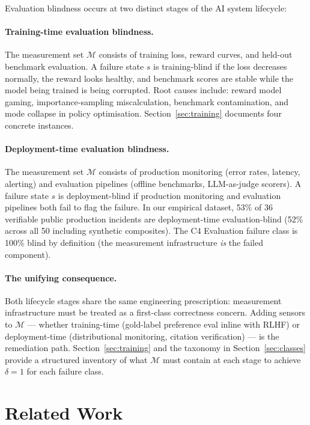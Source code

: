 \documentclass{article}
\begin{document}
Evaluation blindness occurs at two distinct stages of the AI system lifecycle:

\paragraph{Training-time evaluation blindness.}
The measurement set $\mathcal{M}$ consists of training loss, reward curves,
and held-out benchmark evaluation.  A failure state $s$ is training-blind
if the loss decreases normally, the reward looks healthy, and benchmark
scores are stable while the model being trained is being corrupted.
Root causes include: reward model gaming, importance-sampling miscalculation,
benchmark contamination, and mode collapse in policy optimisation.
Section~\ref{sec:training} documents four concrete instances.

\paragraph{Deployment-time evaluation blindness.}
The measurement set $\mathcal{M}$ consists of production monitoring (error
rates, latency, alerting) and evaluation pipelines (offline benchmarks,
LLM-as-judge scorers).  A failure state $s$ is deployment-blind if
production monitoring and evaluation pipelines both fail to flag the
failure.  In our empirical dataset, 53\% of 36 verifiable public production incidents
are deployment-time evaluation-blind (52\% across all 50 including synthetic
composites).  The C4 Evaluation failure class
is 100\% blind by definition (the measurement infrastructure \emph{is}
the failed component).

\paragraph{The unifying consequence.}
Both lifecycle stages share the same engineering prescription: measurement
infrastructure must be treated as a first-class correctness concern.
Adding sensors to $\mathcal{M}$ --- whether training-time (gold-label
preference eval inline with RLHF) or deployment-time (distributional
monitoring, citation verification) --- is the remediation path.
Section~\ref{sec:training} and the taxonomy in Section~\ref{sec:classes}
provide a structured inventory of what $\mathcal{M}$ must contain at
each stage to achieve $\delta = 1$ for each failure class.

\section{Related Work}
\label{sec:related}
\end{document}
